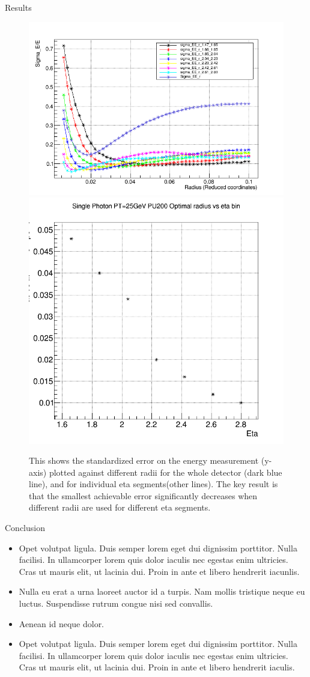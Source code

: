 \documentclass[final,hyperref={pdfpagelabels=false}]{beamer}
\begin{document}
\begin{frame}[t]
\begin{columns}[t]
\begin{column}{.465\textwidth}
\begin{block}{Results}

	

	\begin{figure}
		\includegraphics[width=0.4\linewidth]{SigmaEvsR.png}
		\includegraphics[width=0.4\linewidth]{SingleGammaPT25GeVPU200OptimalRadiusbyEta.png}
			\caption{This shows the standardized error on the energy measurement (y-axis) plotted against different radii for the whole detector (dark blue line), and for individual eta segments(other lines). The key result is that the smallest achievable error significantly decreases when different radii are used for different eta segments.}
	\end{figure}

	
     
\end{block}




\begin{block}{Conclusion}

\begin{itemize}
\item Opet volutpat ligula. Duis semper lorem eget dui dignissim porttitor. Nulla facilisi. In ullamcorper lorem quis dolor iaculis nec egestas enim ultricies. Cras ut mauris elit, ut lacinia dui. Proin in ante et libero hendrerit iacunlis.
\item Nulla eu erat a urna laoreet auctor id a turpis. Nam mollis tristique neque eu luctus. Suspendisse rutrum congue nisi sed convallis. 
\item Aenean id neque dolor.
\item Opet volutpat ligula. Duis semper lorem eget dui dignissim porttitor. Nulla facilisi. In ullamcorper lorem quis dolor iaculis nec egestas enim ultricies. Cras ut mauris elit, ut lacinia dui. Proin in ante et libero hendrerit iaculis.
\end{itemize}


\end{block}
\end{column}
\end{columns}
\end{frame}
\end{document}

